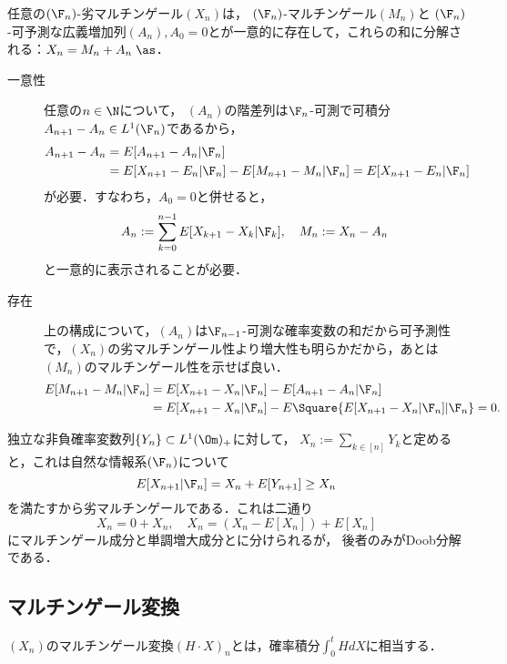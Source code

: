 \documentclass[uplatex,dvipdfmx]{jsreport}
\begin{document}
\begin{theorem}
    任意の$(\F_n)$-劣マルチンゲール$(X_n)$は，
    $(\F_n)$-マルチンゲール$(M_n)$と
    $(\F_n)$-可予測な広義増加列$(A_n),A_0=0$とが一意的に存在して，これらの和に分解される：$X_n=M_n+A_n\;\as$．
\end{theorem}
\begin{Proof}\mbox{}
    \begin{description}
        \item[一意性] 任意の$n\in\N$について，
        $(A_n)$の階差列は$\F_n$-可測で可積分$A_{n+1}-A_n\in L^1(\F_n)$であるから，
        \begin{align*}
            A_{n+1}-A_n&=E[A_{n+1}-A_n|\F_n]\\
            &=E[X_{n+1}-E_n|\F_n]-E[M_{n+1}-M_n|\F_n]=E[X_{n+1}-E_n|\F_n]
        \end{align*}
        が必要．すなわち，$A_0=0$と併せると，
        \[A_n:=\sum_{k=0}^{n-1}E[X_{k+1}-X_k|\F_k],\quad M_n:=X_n-A_n\]
        と一意的に表示されることが必要．
        \item[存在] 上の構成について，$(A_n)$は$\F_{n-1}$-可測な確率変数の和だから可予測性で，$(X_n)$の劣マルチンゲール性より増大性も明らかだから，あとは$(M_n)$のマルチンゲール性を示せば良い．
        \begin{align*}
            E[M_{n+1}-M_n|\F_n]&=E[X_{n+1}-X_n|\F_n]-E[A_{n+1}-A_n|\F_n]\\
            &=E[X_{n+1}-X_n|\F_n]-E\Square{E[X_{n+1}-X_n|\F_n]|\F_n}=0.
        \end{align*}
    \end{description}
\end{Proof}

\begin{observation}
    独立な非負確率変数列$\{Y_n\}\subset L^1(\Om)_+$に対して，
    $X_n:=\sum_{k\in[n]}Y_k$と定めると，これは自然な情報系$(\F_n)$について
    \[E[X_{n+1}|\F_n]=X_n+E[Y_{n+1}]\ge X_n\]
    を満たすから劣マルチンゲールである．これは二通り
    \[X_n=0+X_n,\quad X_n=(X_n-E[X_n])+E[X_n]\]
    にマルチンゲール成分と単調増大成分とに分けられるが，
    後者のみがDoob分解である．
\end{observation}

\subsection{マルチンゲール変換}

\begin{tcolorbox}[colframe=ForestGreen, colback=ForestGreen!10!white,breakable,colbacktitle=ForestGreen!40!white,coltitle=black,fonttitle=\bfseries\sffamily,
title=]
    $(X_n)$のマルチンゲール変換$(H\cdot X)_n$とは，確率積分$\int^t_0HdX$に相当する．
\end{tcolorbox}
\end{document}
